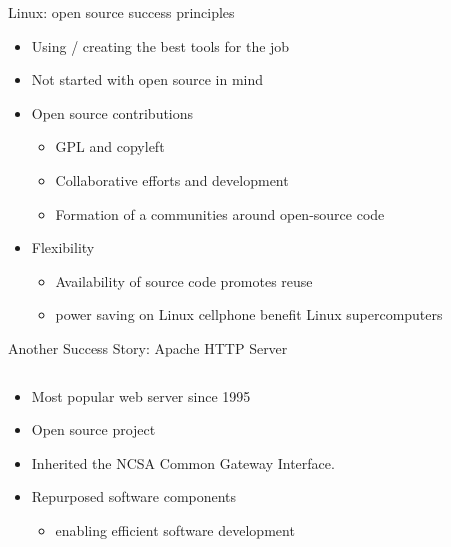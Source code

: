 


\begin{frame}{Linux: open source success principles}
  \begin{itemize}
    \item Using / creating the best tools for the job
    \item Not started with open source in mind~\cite[3:30]{torvalds}
    \item Open source contributions
      \begin{itemize}
        \item GPL and copyleft
        \item Collaborative efforts and development
        \item Formation of a communities around open-source code
      \end{itemize}
    \item Flexibility
      \begin{itemize}
        \item Availability of source code promotes reuse
        \item power saving on Linux cellphone benefit Linux supercomputers~\cite[11:34]{zemlin}
      \end{itemize}
  \end{itemize}
\end{frame}



\begin{frame}{Another Success Story: Apache HTTP Server}
  \begin{column}{.5\textwidth}
    \begin{itemize}
      \item Most popular web server since 1995
      \item Open source project
      \item Inherited the NCSA Common Gateway Interface.
      \item Repurposed software components
        \begin{itemize}
          \item enabling efficient software development~\cite[p. 17]{bisson}
        \end{itemize}
    \end{itemize}
  \end{column}
  \begin{column}{0.5\textwidth}\raggedleft{}
    \begin{figure}
      \def\svgwidth{0.5\columnwidth}
      
      \caption{\Protect\cite{apache}}
    \end{figure}
  \end{column}
\end{frame}

